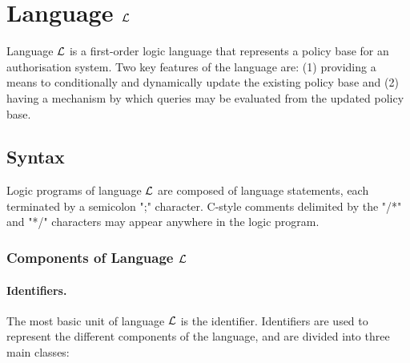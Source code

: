 \documentclass[11pt, twocolumn]{article}
\begin{document}
  \section{Language $\cal{L}$}
    \label{sec-langl}

    Language $\cal{L}$ is a first-order logic language that represents a policy
    base for an authorisation system. Two key features of the language are: (1)
    providing a means to conditionally and dynamically update the existing
    policy base and (2) having a mechanism by which queries may be evaluated
    from the updated policy base.

    \subsection{Syntax}
      \label{subsec-syntax}

      Logic programs of language ${\cal L}$ are composed of language
      statements, each terminated by a semicolon ";" character. C-style
      comments delimited by the "/*" and "*/" characters may appear anywhere in
      the logic program.

      \subsubsection{Components of Language $\cal{L}$}

        \paragraph{Identifiers.}
          The most basic unit of language $\cal{L}$ is the identifier.
          Identifiers are used to represent the different components of the
          language, and are divided into three main classes:
\end{document}

